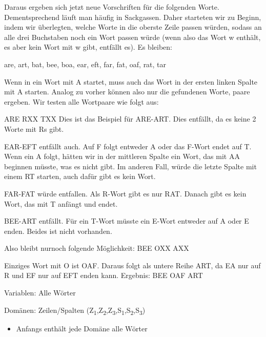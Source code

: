 \documentclass[ngerman]{fbi-aufgabenblatt}
\begin{document}
Daraus ergeben sich jetzt neue Vorschriften für die folgenden Worte. Dementsprechend läuft man häufig in Sackgassen. Daher starteten wir zu Beginn, indem wir überlegten, welche Worte in die oberste Zeile passen würden, sodass an alle drei Buchstaben noch ein Wort passen würde (wenn also das Wort w enthält, es aber kein Wort mit w gibt, entfällt es). Es bleiben:

are, art, bat, bee, boa, ear, eft, far, fat, oaf, rat, tar

Wenn in ein Wort mit A startet, muss auch das Wort in der ersten linken Spalte mit A starten. Analog zu vorher können also nur die gefundenen Worte, paare ergeben. Wir testen alle Wortpaare wie folgt aus:

ARE \newline
RXX \newline
TXX \newline
Dies ist das Beispiel für ARE-ART. Dies entfällt, da es keine 2 Worte mit Rs gibt.

EAR-EFT entfällt auch. Auf F folgt entweder A oder das F-Wort endet auf T. Wenn ein A folgt, hätten wir in der mittleren Spalte ein Wort, das mit AA beginnen müsste, was es nicht gibt. Im anderen Fall, würde die letzte Spalte mit einem RT starten, auch dafür gibt es kein Wort.

FAR-FAT würde entfallen. Als R-Wort gibt es nur RAT. Danach gibt es kein Wort, das mit T anfängt und endet.

BEE-ART entfällt. Für ein T-Wort müsste ein E-Wort entweder auf A oder E enden. Beides ist nicht vorhanden.

Also bleibt nurnoch folgende Möglichkeit: \newline
BEE \newline
OXX \newline
AXX

Einziges Wort mit O ist OAF. Daraus folgt als untere Reihe ART, da EA nur auf R und EF nur auf EFT enden kann. Ergebnis: \newline
BEE \newline
OAF \newline
ART \newline


Variablen: Alle Wörter

Domänen: Zeilen/Spalten (Z\textsubscript{1},Z\textsubscript{2},Z\textsubscript{3},S\textsubscript{1},S\textsubscript{2},S\textsubscript{3})
\begin{itemize}
	\item Anfangs enthält jede Domäne alle Wörter
\end{itemize}
	
\end{document}
